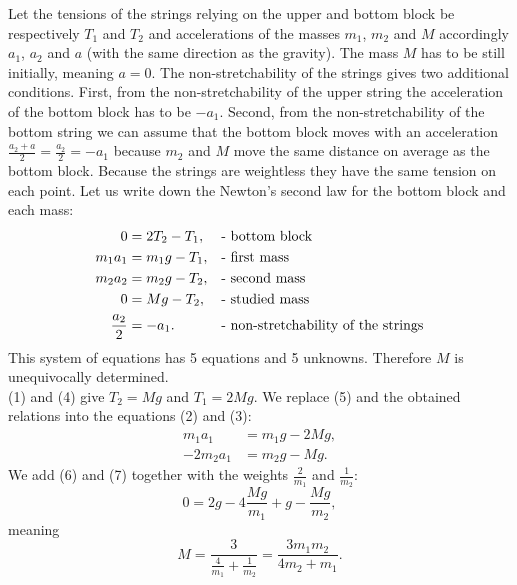 {\ifEngSolution
Let the tensions of the strings relying on the upper and bottom block be respectively $T_1$ and $T_2$ and accelerations of the masses $m_1$, $m_2$ and $M$ accordingly $a_1$, $a_2$ and $a$ (with the same direction as the gravity). The mass $M$ has to be still initially, meaning $a = 0$. The non-stretchability of the strings gives two additional conditions. First, from the non-stretchability of the upper string the acceleration of the bottom block has to be $-a_1$. Second, from the non-stretchability of the bottom string we can assume that the bottom block moves with an acceleration $\frac{a_2 + a}{2} = \frac{a_2}{2} = -a_1$ because $m_2$ and $M$ move the same distance on average as the bottom block. Because the strings are weightless they have the same tension on each point. Let us write down the Newton’s second law for the bottom block and each mass:
\begin{align}
0 &= 2T_2 - T_1,				& &\text{- bottom block}\label{Plokid:eq-1}\\
m_1a_1 &= m_1g - T_1,			& &\text{- first mass}\label{Plokid:eq-2}\\
m_2a_2 &= m_2g - T_2,			& &\text{- second mass}\label{Plokid:eq-3}\\
0 &= Mg - T_2,					& &\text{- studied mass}\label{Plokid:eq-4}\\
\frac{a_2}{2} &= -a_1.			& &\text{- non-stretchability of the strings\label{Plokid:eq-5}}
\end{align} 
This system of equations has 5 equations and 5 unknowns. Therefore $M$ is unequivocally determined.\\
(1) and (4) give $T_2 = Mg$ and $T_1 = 2Mg$. We replace (5) and the obtained relations into the equations (2) and (3):
\begin{align}
m_1a_1 &= m_1g - 2Mg, \label{Plokid:eq-6}\\
-2m_2a_1 &= m_2g - Mg. \label{Plokid:eq-7}
\end{align} 
We add (6) and (7) together with the weights $\frac{2}{m_1}$ and $\frac{1}{m_2}$:
\[
0 = 2g - 4\frac{Mg}{m_1} + g - \frac{Mg}{m_2},
\] 
meaning
\[
M = \frac{3}{\frac{4}{m_1} + \frac{1}{m_2}} = \frac{3m_1m_2}{4m_2 + m_1}.
\]
\fi
}